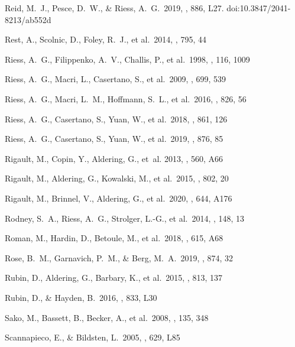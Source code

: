 \documentclass[]{aa}
\begin{document}
\begin{thebibliography}{}

 Reid, M.~J., Pesce, D.~W., \& Riess,
A.~G.\ 2019, \apjl, 886, L27. doi:10.3847/2041-8213/ab552d

 Rest, A., Scolnic, D., Foley, R.~J., et
al.\ 2014, \apj, 795, 44

 Riess, A.~G., Filippenko, A.~V.,
Challis, P., et al.\ 1998, \aj, 116, 1009

 Riess, A.~G., Macri, L., Casertano, S.,
et al.\ 2009, \apj, 699, 539

 Riess, A.~G., Macri, L.~M., Hoffmann,
S.~L., et al.\ 2016, \apj, 826, 56

 Riess, A.~G., Casertano, S., Yuan, W.,
et al.\ 2018, \apj, 861, 126

 Riess, A.~G., Casertano, S., Yuan, W.,
et al.\ 2019, \apj, 876, 85

 Rigault, M., Copin, Y.,
Aldering, G., {et~al.} 2013, \aap, 560, A66

 Rigault, M., Aldering, G., Kowalski,
M., et al.\ 2015, \apj, 802, 20

 Rigault, M., Brinnel, V., Aldering,
G., et al.\ 2020, \aap, 644, A176

 Rodney, S.~A., Riess, A.~G., Strolger,
L.-G., et al.\ 2014, \aj, 148, 13 
  
 Roman, M., Hardin, D., Betoule, M., et
al.\ 2018, \aap, 615, A68

 Rose, B.~M., Garnavich, P.~M., \& Berg,
M.~A.\ 2019, \apj, 874, 32

 Rubin, D., Aldering, G., Barbary, K., et
al.\ 2015, \apj, 813, 137

 Rubin, D., \& Hayden, B.\ 2016,
\apjl, 833, L30


 Sako, M., Bassett, B., Becker, A., et al.\
2008, \aj, 135, 348

 Scannapieco, E., \&
Bildsten, L.\ 2005, \apjl, 629, L85 


\end{thebibliography}
\end{document}
